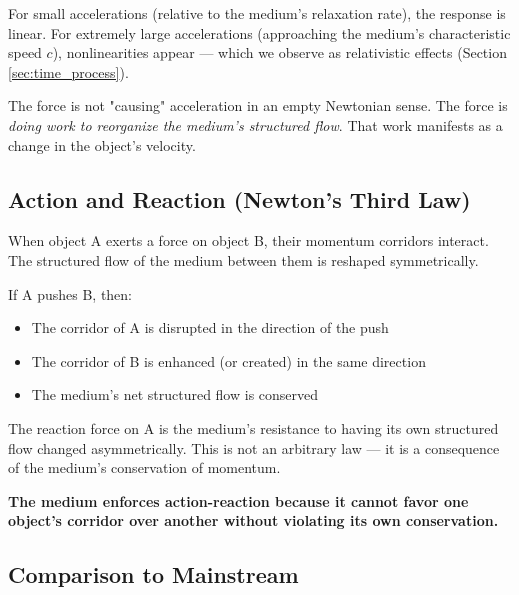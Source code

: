 \documentclass[12pt, a4paper]{article}
\begin{document}
For small accelerations (relative to the medium's relaxation rate), the response is linear. For extremely large accelerations (approaching the medium's characteristic speed \( c \)), nonlinearities appear — which we observe as relativistic effects (Section \ref{sec:time_process}).

The force is not "causing" acceleration in an empty Newtonian sense. The force is \textit{doing work to reorganize the medium's structured flow}. That work manifests as a change in the object's velocity.

\subsection{Action and Reaction (Newton's Third Law)}
\label{subsec:newton_third}

When object A exerts a force on object B, their momentum corridors interact. The structured flow of the medium between them is reshaped symmetrically.

If A pushes B, then:
\begin{itemize}
    \item The corridor of A is disrupted in the direction of the push
    \item The corridor of B is enhanced (or created) in the same direction
    \item The medium's net structured flow is conserved
\end{itemize}

The reaction force on A is the medium's resistance to having its own structured flow changed asymmetrically. This is not an arbitrary law — it is a consequence of the medium's conservation of momentum.

\textbf{The medium enforces action-reaction because it cannot favor one object's corridor over another without violating its own conservation.}

\subsection{Comparison to Mainstream}
\label{subsec:inertia_comparison}
\end{document}
